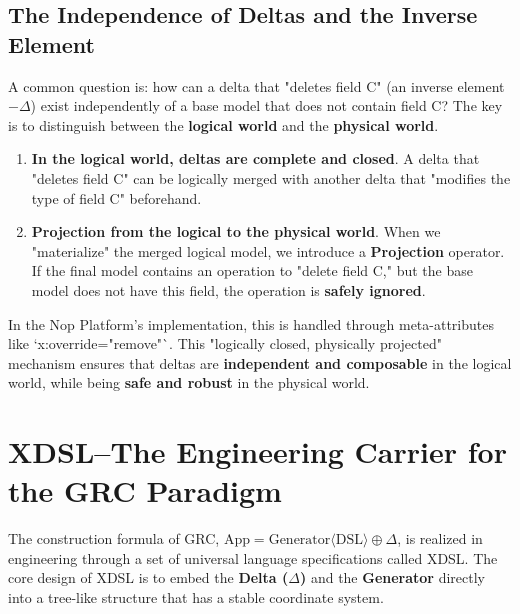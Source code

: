 \documentclass[11pt]{article}
\begin{document}
\subsection{The Independence of Deltas and the Inverse Element}
A common question is: how can a delta that "deletes field C" (an inverse element $-\Delta$) exist independently of a base model that does not contain field C? The key is to distinguish between the \textbf{logical world} and the \textbf{physical world}.
\begin{enumerate}
    \item \textbf{In the logical world, deltas are complete and closed}. A delta that "deletes field C" can be logically merged with another delta that "modifies the type of field C" beforehand.
    \item \textbf{Projection from the logical to the physical world}. When we "materialize" the merged logical model, we introduce a \textbf{Projection} operator. If the final model contains an operation to "delete field C," but the base model does not have this field, the operation is \textbf{safely ignored}.
\end{enumerate}
In the Nop Platform's implementation, this is handled through meta-attributes like `x:override="remove"`. This "logically closed, physically projected" mechanism ensures that deltas are \textbf{independent and composable} in the logical world, while being \textbf{safe and robust} in the physical world.

\section{XDSL--The Engineering Carrier for the GRC Paradigm}

The construction formula of GRC, $\text{App} = \text{Generator}\langle\text{DSL}\rangle \oplus \Delta$, is realized in engineering through a set of universal language specifications called XDSL. The core design of XDSL is to embed the \textbf{Delta ($\Delta$)} and the \textbf{Generator} directly into a tree-like structure that has a stable coordinate system.
\end{document}
